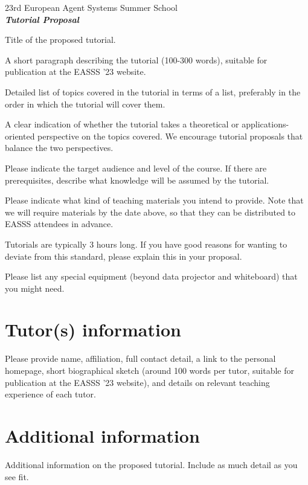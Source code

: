 \documentclass[a4paper]{article}
\begin{document}
\begin{center}
	\Large{23rd European Agent Systems Summer School\\
	\textit{\bfseries{}Tutorial Proposal}}
	\vspace{0.5cm}
\end{center}


\begin{description}\bfseries
	\item[Title:] Title of the proposed tutorial.
	
	\item[Abstract:] A short paragraph describing the tutorial (100-300 words), suitable for publication at the EASSS '23 website.
	
	\item[Topics:] Detailed list of topics covered in the tutorial in terms of a list, preferably in the order in which the tutorial will cover them.
	
	\item[Type:] A clear indication of whether the tutorial takes a theoretical or applications-oriented perspective on the topics covered. We encourage tutorial proposals that balance the two perspectives.
	
	\item[Level:] Please indicate the target audience and level of the course. If there are prerequisites, describe what knowledge will be assumed by the tutorial.
	
	\item[Materials:] Please indicate what kind of teaching materials you intend to provide. Note that we will require materials by the date above, so that they can be distributed to EASSS attendees in advance.
	
	\item[Duration:] Tutorials are typically 3 hours long. If you have good reasons for wanting to deviate from this standard, please explain this in your proposal.
	
	\item[Equipment:] Please list any special equipment (beyond data projector and whiteboard) that you might need.
\end{description}

\section*{Tutor(s) information}

Please provide name, affiliation, full contact detail, a link to the personal homepage, short biographical sketch (around 100 words per tutor, suitable for publication at the EASSS '23 website), and details on relevant teaching experience of each tutor.

\section*{Additional information}

Additional information on the proposed tutorial. Include as much detail as you see fit.
\end{document}

